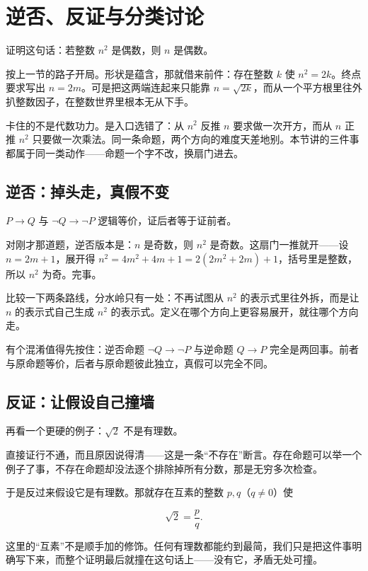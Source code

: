 \section{逆否、反证与分类讨论}
\label{sec:01-Mathematical-Language/03-Proof-Techniques/02}

证明这句话：若整数 \(n^2\) 是偶数，则 \(n\) 是偶数。

按上一节的路子开局。形状是蕴含，那就借来前件：存在整数 \(k\) 使 \(n^2=2k\)。终点要求写出 \(n=2m\)。可是把这两端连起来只能靠 \(n=\sqrt{2k}\)，而从一个平方根里往外扒整数因子，在整数世界里根本无从下手。

卡住的不是代数功力。是入口选错了：从 \(n^2\) 反推 \(n\) 要求做一次开方，而从 \(n\) 正推 \(n^2\) 只要做一次乘法。同一条命题，两个方向的难度天差地别。本节讲的三件事都属于同一类动作——命题一个字不改，换扇门进去。

\subsection{逆否：掉头走，真假不变}

\(P\to Q\) 与 \(\neg Q\to\neg P\) 逻辑等价，证后者等于证前者。

对刚才那道题，逆否版本是：\(n\) 是奇数，则 \(n^2\) 是奇数。这扇门一推就开——设 \(n=2m+1\)，展开得 \(n^2=4m^2+4m+1=2(2m^2+2m)+1\)，括号里是整数，所以 \(n^2\) 为奇。完事。

比较一下两条路线，分水岭只有一处：不再试图从 \(n^2\) 的表示式里往外拆，而是让 \(n\) 的表示式自己生成 \(n^2\) 的表示式。定义在哪个方向上更容易展开，就往哪个方向走。

有个混淆值得先按住：逆否命题 \(\neg Q\to\neg P\) 与逆命题 \(Q\to P\) 完全是两回事。前者与原命题等价，后者与原命题彼此独立，真假可以完全不同。

\subsection{反证：让假设自己撞墙}

再看一个更硬的例子：\(\sqrt2\) 不是有理数。

直接证行不通，而且原因说得清——这是一条``不存在''断言。存在命题可以举一个例子了事，不存在命题却没法逐个排除掉所有分数，那是无穷多次检查。

于是反过来假设它是有理数。那就存在互素的整数 \(p,q\)（\(q\ne0\)）使

\[
\sqrt2=\frac pq .
\]

这里的``互素''不是顺手加的修饰。任何有理数都能约到最简，我们只是把这件事明确写下来，而整个证明最后就撞在这句话上——没有它，矛盾无处可撞。

